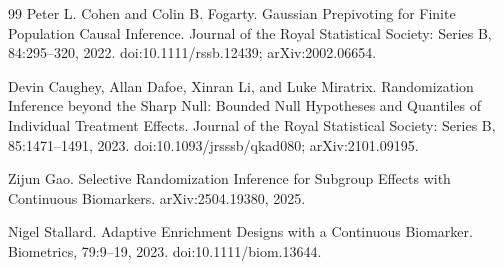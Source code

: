 \documentclass{article}
\begin{document}
\begin{thebibliography}{99}
   Peter L. Cohen and Colin B. Fogarty. Gaussian Prepivoting for Finite Population Causal Inference. Journal of the Royal Statistical Society: Series B, 84:295--320, 2022. doi:10.1111/rssb.12439; arXiv:2002.06654.

   Devin Caughey, Allan Dafoe, Xinran Li, and Luke Miratrix. Randomization Inference beyond the Sharp Null: Bounded Null Hypotheses and Quantiles of Individual Treatment Effects. Journal of the Royal Statistical Society: Series B, 85:1471--1491, 2023. doi:10.1093/jrsssb/qkad080; arXiv:2101.09195.

   Zijun Gao. Selective Randomization Inference for Subgroup Effects with Continuous Biomarkers. arXiv:2504.19380, 2025.

   Nigel Stallard. Adaptive Enrichment Designs with a Continuous Biomarker. Biometrics, 79:9--19, 2023. doi:10.1111/biom.13644.

\end{thebibliography}
\end{document}
